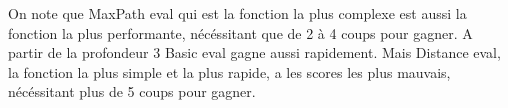 		On note que MaxPath eval qui est la fonction la plus complexe
		est aussi la fonction la plus performante, nécéssitant que de 2 à 4
		coups pour gagner. A partir de la profondeur 3 Basic eval gagne aussi
		rapidement. Mais Distance eval, la fonction la plus simple et la plus
		rapide, a les scores les plus mauvais, nécéssitant plus de 5 coups
		pour gagner.
